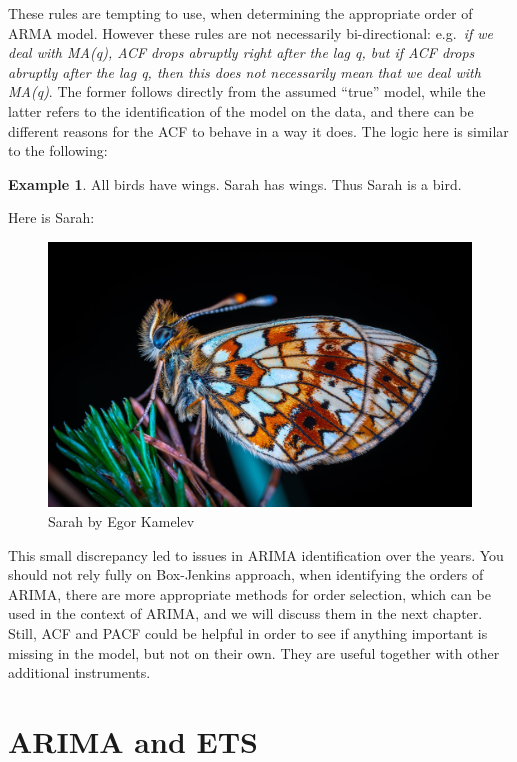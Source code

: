 \documentclass[
]{book}
\theoremstyle{definition}
\theoremstyle{definition}
\newtheorem{example}{Example}[chapter]
\theoremstyle{definition}
\theoremstyle{definition}
\theoremstyle{remark}
\begin{document}
These rules are tempting to use, when determining the appropriate order of ARMA model. However these rules are not necessarily bi-directional: e.g.~\emph{if we deal with MA(q), ACF drops abruptly right after the lag q, but if ACF drops abruptly after the lag q, then this does not necessarily mean that we deal with MA(q)}. The former follows directly from the assumed ``true'' model, while the latter refers to the identification of the model on the data, and there can be different reasons for the ACF to behave in a way it does. The logic here is similar to the following:

\begin{example}
\protect\hypertarget{exm:unnamed-chunk-53}{}{\label{exm:unnamed-chunk-53} }All birds have wings. Sarah has wings. Thus Sarah is a bird.

Here is Sarah:
\end{example}

\begin{figure}
\includegraphics[width=0.75\linewidth]{./images/09-Sarah} \caption{Sarah by Egor Kamelev}\label{fig:SarahButterfly}
\end{figure}

This small discrepancy led to issues in ARIMA identification over the years. You should not rely fully on Box-Jenkins approach, when identifying the orders of ARIMA, there are more appropriate methods for order selection, which can be used in the context of ARIMA, and we will discuss them in the next chapter. Still, ACF and PACF could be helpful in order to see if anything important is missing in the model, but not on their own. They are useful together with other additional instruments.

\hypertarget{ARIMAandETS}{%
\section{ARIMA and ETS}\label{ARIMAandETS}}
\end{document}
